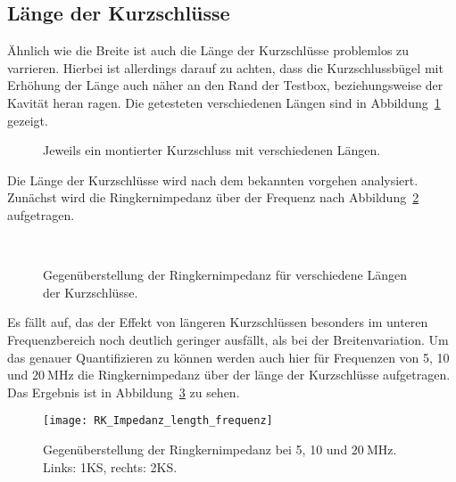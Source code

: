 \subsection{L\"ange der Kurzschl\"usse}
\"Ahnlich wie die Breite ist auch die L\"ange der Kurzschl\"usse problemlos zu varrieren. Hierbei ist allerdings darauf zu achten, dass die Kurzschlussb\"ugel mit Erh\"ohung der L\"ange auch n\"aher an den Rand der Testbox, beziehungsweise der Kavit\"at heran ragen. Die getesteten verschiedenen L\"angen sind in Abbildung~\ref{fig:ringcoreheightCST} gezeigt.
\begin{figure}[htb]
	\centering
	\hspace{0.05\textwidth}
	\hspace{0.05\textwidth}
	\caption{Jeweils ein montierter Kurzschluss mit verschiedenen L\"angen.}
	\label{fig:ringcoreheightCST}
\end{figure}
\par 
Die L\"ange der Kurzschl\"usse wird nach dem bekannten vorgehen analysiert. Zun\"achst wird die Ringkernimpedanz \"uber der Frequenz nach Abbildung~\ref{fig:ringcoreheight} aufgetragen.
\begin{figure}[htb]
	\centering
	\\
	\caption{Gegen\"uberstellung der Ringkernimpedanz f\"ur verschiedene L\"angen der Kurzschl\"usse.}
	\label{fig:ringcoreheight}
\end{figure}
\par
Es f\"allt auf, das der Effekt von l\"angeren Kurzschl\"ussen besonders im unteren Frequenzbereich noch deutlich geringer ausf\"allt, als bei der Breitenvariation. Um das genauer Quantifizieren zu k\"onnen werden auch hier f\"ur Frequenzen von 5, 10 und $\SI{20}{\mega\hertz}$ die Ringkernimpedanz \"uber der l\"ange der Kurzschl\"usse aufgetragen. Das Ergebnis ist in Abbildung~\ref{fig:ringcoreheight20} zu sehen.
\begin{figure}[htb]
	\centering
	\texttt{[image: RK\_Impedanz\_length\_frequenz]}
	\caption{Gegen\"uberstellung der Ringkernimpedanz bei 5, 10 und $\SI{20}{\mega\hertz}$. Links: 1KS, rechts: 2KS.}
	\label{fig:ringcoreheight20}
\end{figure}
